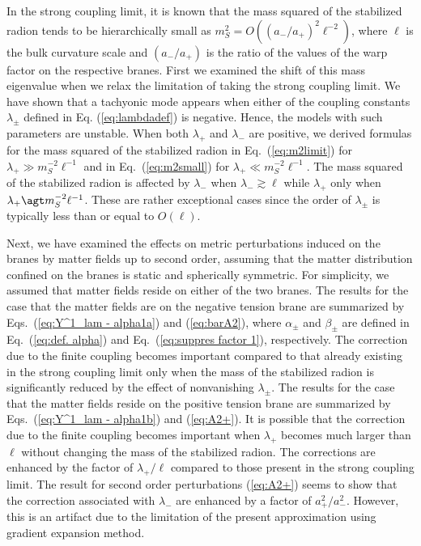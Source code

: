 \documentclass[a4paper,showpacs,preprintnumbers,amsmath,amssymb]{revtex4}
\begin{document}
In the strong coupling limit, it is known that the mass squared of the stabilized radion tends to be hierarchically small as $m_S^2=O((a_-/a_+)^2 \ell^{-2})$, where $\ell$ is the bulk curvature scale and $(a_-/a_+)$ is the ratio of the values of the warp factor on the respective branes. 
First we examined the shift of this mass eigenvalue when we relax the limitation of taking the strong coupling limit. 
We have shown that a tachyonic mode appears when either of the coupling constants $\lambda_\pm$ defined in Eq. (\ref{eq:lambdadef}) is negative. 
Hence, the models with such parameters are unstable. 
When both $\lambda_+$ and $\lambda_-$ are positive, we derived formulas for the mass squared of the stabilized radion in Eq.~(\ref{eq:m2limit}) for  
$\lambda_+ \gg m_S^{-2}\ell^{-1}$ and in Eq.~(\ref{eq:m2small}) for $\lambda_+ \ll m_S^{-2}\ell^{-1}$.  
The mass squared of the stabilized radion is affected by $\lambda_-$ when $\lambda_-\gtrsim \ell$ while 
$\lambda_+$ only when $\lambda_+ \agt m_S^{-2}\ell^{-1}$. 
These are rather exceptional cases since the order of 
$\lambda_\pm$ is typically less than or equal to $O(\ell)$. 


Next, we have examined the effects on metric perturbations induced on the branes by matter fields up to second order, assuming that the matter distribution confined on the branes is static and spherically symmetric. 
For simplicity, we assumed that matter fields reside on either of the two branes. 
The results for the case that the matter fields are on the negative tension brane are summarized by Eqs.~(\ref{eq:Y^1_lam - alpha1a}) and (\ref{eq:barA2}), 
where $\alpha_\pm$ and $\beta_\pm$ are defined in 
Eq.~(\ref{eq:def. alpha}) and Eq.~(\ref{eq:suppres factor 1}), respectively. 
The correction due to the finite coupling becomes important compared to that already existing in the strong coupling limit only when the mass of the stabilized radion is significantly reduced by the effect of nonvanishing $\lambda_\pm$.
The results for the case that the matter fields reside on the positive tension brane are summarized by Eqs.~(\ref{eq:Y^1_lam - alpha1b}) and
(\ref{eq:A2+}).  
It is possible that the correction due to the finite coupling becomes important when $\lambda_+$ becomes much larger than $\ell$ without changing the mass of the stabilized radion. The corrections are enhanced by the factor of $\lambda_+/\ell$ compared to those present in the strong coupling limit. 
The result for second order perturbations (\ref{eq:A2+}) seems to show that the correction associated with $\lambda_-$ are enhanced by a factor of $a_+^2/a_-^2$. 
However, this is an artifact due to the limitation of the present approximation using gradient expansion method. 
\end{document}
